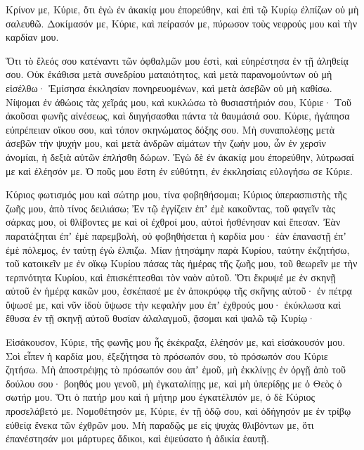 \begin{spacing}{1.1}
\begin{multicols}{2}
Κρίνον με, Κύριε, ὅτι ἐγὼ ἐν ἀκακίᾳ μου ἐπορεύθην, καὶ ἐπὶ τῷ Κυρίῳ ἐλπίζων οὐ μὴ σαλευθῶ.
Δοκίμασόν με, Κύριε, καὶ πείρασόν με, πύρωσον τοὺς νεφρούς μου καὶ τὴν καρδίαν μου.

Ὅτι τὸ ἔλεός σου κατέναντι τῶν ὀφθαλμῶν μου ἐστὶ, καὶ εὐηρέστησα ἐν τῇ ἀληθείᾳ σου.
Οὐκ ἐκάθισα μετὰ συνεδρίου ματαιότητος, καὶ μετὰ παρανομούντων οὐ μὴ εἰσέλθω·
Ἐμίσησα ἐκκλησίαν πονηρευομένων, καὶ μετὰ ἀσεβῶν οὐ μὴ καθίσω.
Νίψομαι ἐν ἀθώοις τὰς χεῖράς μου, καὶ κυκλώσω τὸ θυσιαστήριόν σου, Κύριε·
Τοῦ ἀκοῦσαι φωνῆς αἰνέσεως, καὶ διηγήσασθαι πάντα τὰ θαυμάσιά σου.
Κύριε, ἠγάπησα εὐπρέπειαν οἴκου σου, καὶ τόπον σκηνώματος δόξης σου.
Μὴ συναπολέσῃς μετὰ ἀσεβῶν τὴν ψυχήν μου, καὶ μετὰ ἀνδρῶν αἱμάτων τὴν ζωήν μου,
ὧν ἐν χερσὶν ἀνομίαι, ἡ δεξιὰ αὐτῶν ἐπλήσθη δώρων.
Ἐγὼ δὲ ἐν ἀκακίᾳ μου ἐπορεύθην, λύτρωσαί με καὶ ἐλέησόν με.
Ὁ ποῦς μου ἔστη ἐν εὐθύτητι, ἐν ἐκκλησίαις εὐλογήσω σε Κύριε.

Κύριος φωτισμός μου καὶ σώτηρ μου, τίνα φοβηθήσομαι; Κύριος ὑπερασπιστὴς τῆς ζωῆς μου, ἀπὸ τίνος δειλιάσω;
Ἐν τῷ ἐγγίζειν ἐπʼ ἐμὲ κακοῦντας, τοῦ φαγεῖν τὰς σάρκας μου, οἱ θλίβοντες με καὶ οἱ ἐχθροί μου, αὐτοὶ ἠσθένησαν καὶ ἔπεσαν.
Ἐὰν παρατάξηται ἐπʼ ἐμὲ παρεμβολὴ, οὐ φοβηθήσεται ἡ καρδία μου· ἐὰν ἐπαναστῇ ἐπʼ ἐμὲ πόλεμος, ἐν ταύτῃ ἐγὼ ἐλπιζω.
Μίαν ᾐτησάμην παρὰ Κυρίου, ταύτην ἐκζητήσω, τοῦ κατοικεῖν με ἐν οἴκῳ Κυρίου πάσας τὰς ἡμέρας τῆς ζωῆς μου, τοῦ θεωρεῖν με τὴν τερπνότητα Κυρίου, καὶ ἐπισκέπτεσθαι τὸν ναὸν αὐτοῦ.
Ὅτι ἔκρυψέ με ἐν σκηνῇ αὐτοῦ ἐν ἡμέρᾳ κακῶν μου, ἐσκέπασέ με ἐν ἀποκρύφῳ τῆς σκῆνης αὐτοῦ· ἐν πέτρᾳ ὕψωσέ με,
καὶ νῦν ἰδοὺ ὕψωσε τὴν κεφαλήν μου ἐπʼ ἐχθρούς μου· ἐκύκλωσα καὶ ἔθυσα ἐν τῇ σκηνῇ αὐτοῦ θυσίαν ἀλαλαγμοῦ, ᾄσομαι καὶ ψαλῶ τῷ Κυρίῳ·

Εἰσάκουσον, Κύριε, τῆς φωνῆς μου ἧς ἐκέκραξα, ἐλέησόν με, καὶ εἰσάκουσόν μου.
Σοὶ εἶπεν ἡ καρδία μου, ἐξεζήτησα τὸ πρόσωπόν σου, τὸ πρόσωπόν σου Κύριε ζητήσω.
Μὴ ἀποστρέψῃς τὸ πρόσωπόν σου ἀπʼ ἐμοῦ, μὴ ἐκκλίνῃς ἐν ὀργῇ ἀπὸ τοῦ δούλου σου· βοηθός μου γενοῦ, μὴ ἐγκαταλίπῃς με, καὶ μὴ ὑπερίδῃς με ὁ Θεὸς ὁ σωτήρ μου.
Ὅτι ὁ πατήρ μου καὶ ἡ μήτηρ μου ἐγκατέλιπόν με, ὁ δὲ Κύριος προσελάβετό με.
Νομοθέτησόν με, Κύριε, ἐν τῇ ὁδῷ σου, καὶ ὁδήγησόν με ἐν τρίβῳ εὐθείᾳ ἕνεκα τῶν ἐχθρῶν μου.
Μὴ παραδῷς με εἰς ψυχὰς θλιβόντων με, ὅτι ἐπανέστησάν μοι μάρτυρες ἄδικοι, καὶ ἐψεύσατο ἡ ἀδικία ἑαυτῇ.


\end{multicols}
\end{spacing}
